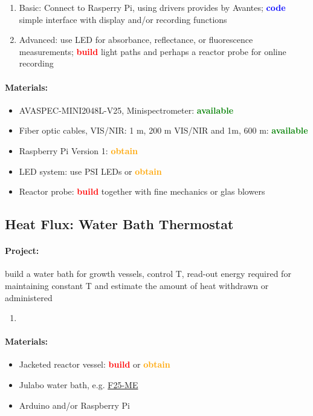 \documentclass[12pt,a4paper]{scrartcl}
\newcommand{\obtain}[0]{\textcolor{orange}{\textbf{obtain}}}
\newcommand{\avail}[0]{\textcolor{green}{\textbf{available}}}
\newcommand{\build}[0]{\textcolor{red}{\textbf{build}}}
\newcommand{\code}[0]{\textcolor{blue}{\textbf{code}}}
\begin{document}
\begin{enumerate}
\item Basic: Connect to Rasperry Pi, using drivers provides by
  Avantes; \code{} simple interface with display and/or recording
  functions
\item Advanced: use LED for absorbance, reflectance, or fluorescence
  measurements; \build{} light paths and perhaps a reactor probe for
  online recording
\end{enumerate}

\paragraph{Materials:}
\begin{itemize}
\item AVASPEC-MINI2048L-V25, Minispectrometer: \avail{}
\item Fiber optic cables, VIS/NIR: 1 m, 200 \textmu{}m VIS/NIR and 1m,
  600 \textmu{}m: \avail{}
\item Raspberry Pi Version 1: \obtain{}
\item LED system: use PSI LEDs or \obtain{}
\item Reactor probe: \build{} together with fine mechanics or glas
  blowers
\end{itemize}


\subsection{Heat Flux: Water Bath Thermostat}
\label{heat}

\paragraph{Project:} build a water bath for growth vessels, control
T, read-out energy required for maintaining constant T and estimate
the amount of heat withdrawn or administered

\begin{enumerate}
\item
\end{enumerate}

\paragraph{Materials:}
\begin{itemize}
\item Jacketed reactor vessel: \build{} or \obtain{}
\item Julabo water bath,
e.g. \href{http://www.laborhandel24.de/9162625-de?utm_source=google_shopping&gclid=Cj0KEQiA496zBRDoi5OY3p2xmaUBEiQArLNnK6uWkryhjvkNdmRLgcg2W_HIO9W1aKaKCO9gmvlkt_MaAmhe8P8HAQ}{F25-ME}
\item Arduino and/or Raspberry Pi
\end{itemize}
\end{document}
